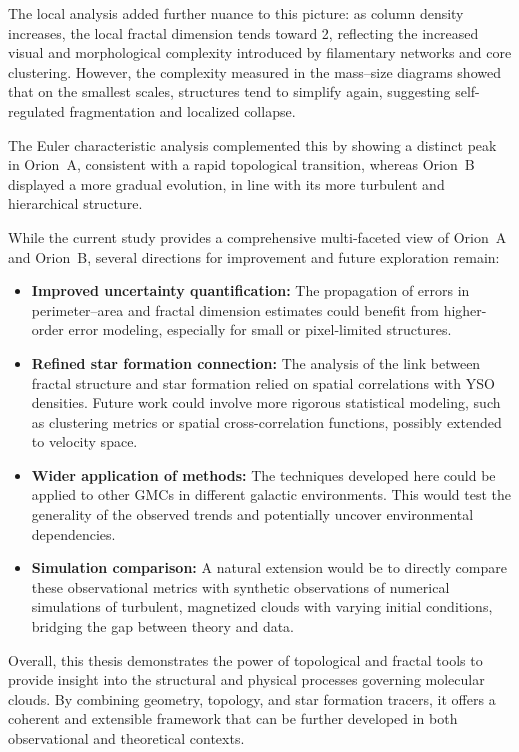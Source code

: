 The local analysis added further nuance to this picture: as column density increases, the local fractal dimension tends toward 2, reflecting the increased visual and morphological complexity introduced by filamentary networks and core clustering. However, the complexity measured in the mass–size diagrams showed that on the smallest scales, structures tend to simplify again, suggesting self-regulated fragmentation and localized collapse.

The Euler characteristic analysis complemented this by showing a distinct peak in Orion~A, consistent with a rapid topological transition, whereas Orion~B displayed a more gradual evolution, in line with its more turbulent and hierarchical structure.

While the current study provides a comprehensive multi-faceted view of Orion~A and Orion~B, several directions for improvement and future exploration remain:

\begin{itemize}
    \item \textbf{Improved uncertainty quantification:} The propagation of errors in perimeter–area and fractal dimension estimates could benefit from higher-order error modeling, especially for small or pixel-limited structures.
    
    \item \textbf{Refined star formation connection:} The analysis of the link between fractal structure and star formation relied on spatial correlations with YSO densities. Future work could involve more rigorous statistical modeling, such as clustering metrics or spatial cross-correlation functions, possibly extended to velocity space.

    \item \textbf{Wider application of methods:} The techniques developed here could be applied to other GMCs in different galactic environments. This would test the generality of the observed trends and potentially uncover environmental dependencies.

    \item \textbf{Simulation comparison:} A natural extension would be to directly compare these observational metrics with synthetic observations of numerical simulations of turbulent, magnetized clouds with varying initial conditions, bridging the gap between theory and data.
\end{itemize}

Overall, this thesis demonstrates the power of topological and fractal tools to provide insight into the structural and physical processes governing molecular clouds. By combining geometry, topology, and star formation tracers, it offers a coherent and extensible framework that can be further developed in both observational and theoretical contexts.


